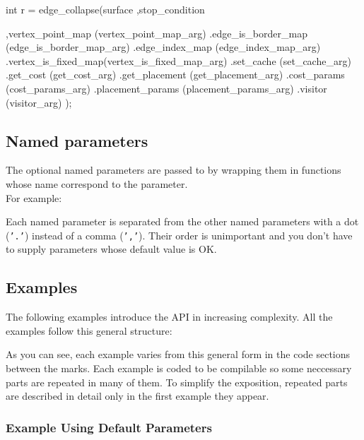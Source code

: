 \begin{cprog}
int r = edge_collapse(surface
                     ,stop_condition
                     
                     ,vertex_point_map   (vertex_point_map_arg)
                     .edge_is_border_map (edge_is_border_map_arg)
                     .edge_index_map     (edge_index_map_arg)
                     .vertex_is_fixed_map(vertex_is_fixed_map_arg)
                     .set_cache          (set_cache_arg)
                     .get_cost           (get_cost_arg)
                     .get_placement      (get_placement_arg)
                     .cost_params        (cost_params_arg)
                     .placement_params   (placement_params_arg)
                     .visitor            (visitor_arg)
                     );
\end{cprog}

\subsection{Named parameters}

The optional named parameters are passed to 
by wrapping them in functions whose name correspond to the parameter.\\
For example: 

Each named parameter is separated from the other named parameters
with a dot ({\tt '.'}) instead of a comma ({\tt ','}).
Their order is unimportant and you don't have to supply parameters
whose default value is OK.


\subsection{Examples}

The following examples introduce the API in increasing complexity. All the examples follow this general structure:


As you can see, each example varies from this general form in the code sections between the marks.
Each example is coded to be compilable so some neccessary parts are repeated in many of them. To simplify the exposition, repeated parts are described in detail only in the first example they appear.

\subsubsection{Example Using Default Parameters}

